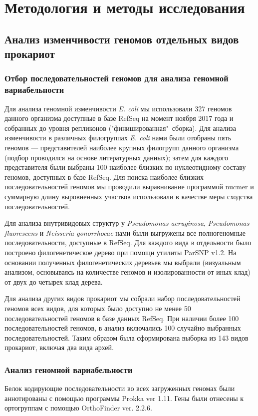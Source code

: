 \section*{Методология и методы исследования}

\subsection*{Анализ изменчивости геномов отдельных видов прокариот}
\subsubsection*{Отбор последовательностей геномов для анализа геномной вариабельности}
Для анализа геномной изменчивости \textit{E. coli} мы использовали 327 геномов данного организма доступные в базе RefSeq на момент ноября 2017 года и собранных до уровня репликонов ("финишированная"\ сборка). Для анализа изменчивости в различных филогруппах \textit{E. coli} нами были отобраны пять геномов --- представителей наиболее крупных филогрупп данного организма (подбор проводился на основе литературных данных); затем для каждого представителя были выбраны 100 наиболее близких по нуклеотидному составу геномов, доступных в базе RefSeq. Для поиска наиболее близких последовательностей геномов мы проводили выравнивание программой nucmer и суммарную длину выровненных участков использовали в качестве меры сходства последовательностей. 

Для анализа внутривидовых структур у \textit{Pseudomonas aeruginosa}, \textit{Pseudomonas fluorescens} и \textit{Neisseria gonorrhoeae} нами были выгружены все полногеномные последовательности, доступные в RefSeq. Для каждого вида в отдельности было построено филогенетическое дерево при помощи утилиты ParSNP v1.2. На основании полученных филогенетических деревьев мы выбрали (визуальным анализом, основываясь на количестве геномов и изолированности от иных клад) от двух до четырех клад дерева. 

Для анализа других видов прокариот мы собрали набор последовательностей геномов всех видов, для которых было доступно не менее 50 последовательностей геномов в базе данных RefSeq. При наличии более 100 последовательностей геномов, в анализ включались 100 случайно выбранных последовательностей. Таким образом была сформирована выборка из 143 видов прокариот, включая два вида архей.

\subsubsection*{Анализ геномной вариабельности}
Белок кодирующие последовательности во всех загруженных геномах были аннотированы с помощью программы Prokka ver 1.11. Гены были отнесены к ортогруппам с помощью OrthoFinder ver. 2.2.6. 

